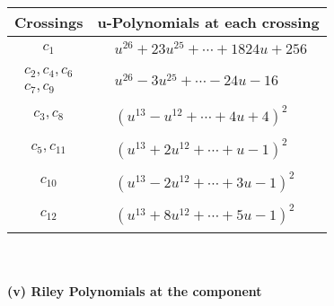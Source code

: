 \documentclass[1p]{elsarticle_modified}
\theoremstyle{definition}
\begin{document}
\begin{tabular}{m{50pt}|m{274pt}}
Crossings & \hspace{64pt}u-Polynomials at each crossing \\
\hline $$\begin{aligned}c_{1}\end{aligned}$$&$\begin{aligned}
&u^{26}+23 u^{25}+\cdots+1824 u+256
\end{aligned}$\\
\hline $$\begin{aligned}c_{2},c_{4},c_{6}\\c_{7},c_{9}\end{aligned}$$&$\begin{aligned}
&u^{26}-3 u^{25}+\cdots-24 u-16
\end{aligned}$\\
\hline $$\begin{aligned}c_{3},c_{8}\end{aligned}$$&$\begin{aligned}
&(u^{13}- u^{12}+\cdots+4 u+4)^{2}
\end{aligned}$\\
\hline $$\begin{aligned}c_{5},c_{11}\end{aligned}$$&$\begin{aligned}
&(u^{13}+2 u^{12}+\cdots+u-1)^{2}
\end{aligned}$\\
\hline $$\begin{aligned}c_{10}\end{aligned}$$&$\begin{aligned}
&(u^{13}-2 u^{12}+\cdots+3 u-1)^{2}
\end{aligned}$\\
\hline $$\begin{aligned}c_{12}\end{aligned}$$&$\begin{aligned}
&(u^{13}+8 u^{12}+\cdots+5 u-1)^{2}
\end{aligned}$\\
\hline
\end{tabular}\\~\\
\newpage\renewcommand{\arraystretch}{1}
\flushleft \textbf{(v) Riley Polynomials at the component}\newline \\
\end{document}
